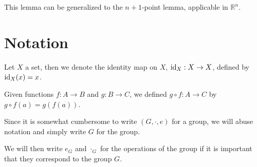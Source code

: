 \documentclass[12pt]{article}
\begin{document}
This lemma can be generalized to the $n+1$-point lemma,
applicable in $\mathbb{R}^{n}$.

\appendix
\newpage

\section{Notation}
Let $X$ a set, then we denote the identity map on $X$,
$\operatorname{id}_{X} : X \to X$, defined by $\operatorname{id}_{X}(x) = x$.

Given functions $f:A\to B$ and $g:B\to C$,
we defined $g\circ f:A\to C$ by $g\circ f(a) = g(f(a))$.

Since it is somewhat cumbersome to write $(G,\cdot,e)$
for a group, we will abuse notation and simply write $G$ for the group.

We will then write $e_{G}$ and $\cdot_{G}$ for the operations of the group
if it is important that they correspond to the group $G$.
\end{document}
